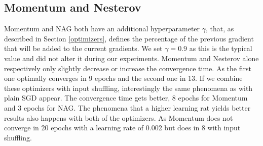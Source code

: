 \subsection{Momentum and Nesterov}
Momentum\cite{momentum} and NAG \cite{nag} both have an additional hyperparameter $\gamma$, that, as described in Section \ref{optimizers}, defines the percentage of the previous gradient that will be added to the current gradients. We set $\gamma = 0.9$ as this is the typical value and did not alter it during our experiments. Momentum and Nesterov alone respectively only slightly decrease or increase the convergence time. As the first one optimally converges in 9 epochs and the second one in 13. If we combine these optimizers with input shuffling, interestingly the same phenomena as with plain SGD appear. The convergence time gets better, 8 epochs for Momentum and 3 epochs for NAG. The phenomena that a higher learning rat yields better results also happens with both of the optimizers. As Momentum does not converge in 20 epochs with a learning rate of 0.002 but does in 8 with input shuffling. 
